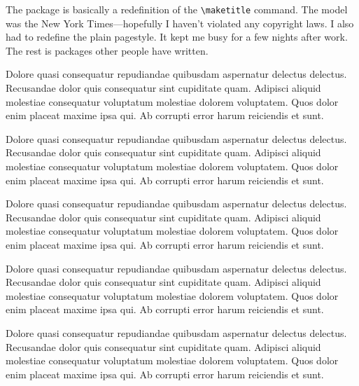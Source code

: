 \documentclass{article}
\date{\today}
\begin{document}
\maketitle

\begin{multicols}{2}{


The package is basically a redefinition of the \verb+\maketitle+ command.  The model was the New York Times---hopefully I haven't violated any copyright laws.  I also had to redefine the plain pagestyle.  It kept me busy for a few nights after work.  The rest is packages other people have written.      

Dolore quasi consequatur repudiandae quibusdam aspernatur delectus delectus. Recusandae dolor quis consequatur sint cupiditate quam. Adipisci aliquid molestiae consequatur voluptatum molestiae dolorem voluptatem. Quos dolor enim placeat maxime ipsa qui. Ab corrupti error harum reiciendis et sunt.

Dolore quasi consequatur repudiandae quibusdam aspernatur delectus delectus. Recusandae dolor quis consequatur sint cupiditate quam. Adipisci aliquid molestiae consequatur voluptatum molestiae dolorem voluptatem. Quos dolor enim placeat maxime ipsa qui. Ab corrupti error harum reiciendis et sunt.

Dolore quasi consequatur repudiandae quibusdam aspernatur delectus delectus. Recusandae dolor quis consequatur sint cupiditate quam. Adipisci aliquid molestiae consequatur voluptatum molestiae dolorem voluptatem. Quos dolor enim placeat maxime ipsa qui. Ab corrupti error harum reiciendis et sunt.

Dolore quasi consequatur repudiandae quibusdam aspernatur delectus delectus. Recusandae dolor quis consequatur sint cupiditate quam. Adipisci aliquid molestiae consequatur voluptatum molestiae dolorem voluptatem. Quos dolor enim placeat maxime ipsa qui. Ab corrupti error harum reiciendis et sunt.

Dolore quasi consequatur repudiandae quibusdam aspernatur delectus delectus. Recusandae dolor quis consequatur sint cupiditate quam. Adipisci aliquid molestiae consequatur voluptatum molestiae dolorem voluptatem. Quos dolor enim placeat maxime ipsa qui. Ab corrupti error harum reiciendis et sunt.

}
\end{multicols}
\end{document}
